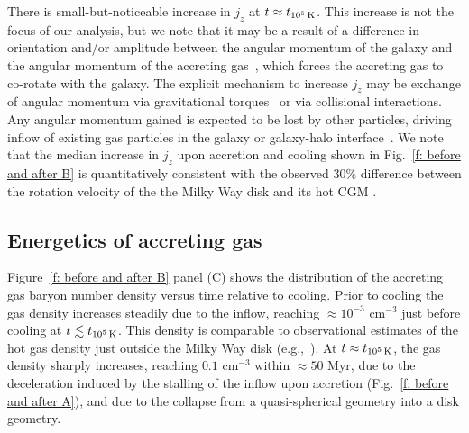 \documentclass[fleqn,usenatbib]{mnras}
\newcommand{\tcon}{t_{10^5\,{\rm K}}}
\begin{document}
There is small-but-noticeable increase in $j_z$ at $t \approx \tcon$.
This increase is not the focus of our analysis, but we note that it may be a result of a difference in orientation and/or amplitude between the angular momentum of the galaxy and the angular momentum of the accreting gas~\citep[e.g.][]{Danovich2012, DeFelippis2017}, which forces the accreting gas to co-rotate with the galaxy.
The explicit mechanism to increase $j_z$ may be exchange of angular momentum via gravitational torques~\citep[e.g.][]{Danovich2015} or via collisional interactions.
Any angular momentum gained is expected to be lost by other particles, driving inflow of existing gas particles in the galaxy or galaxy-halo interface~\citep[e.g.][]{Mayor1981, Pezzulli2017}.
We note that the median increase in $j_z$ upon accretion and cooling shown in Fig.~\ref{f: before and after B} is quantitatively consistent with the observed $30\%$ difference between the rotation velocity of the the Milky Way disk and its hot CGM \citep{Hodges-Kluck2016}.

\subsection{Energetics of accreting gas}
\label{s: mechanics -- energy balance}

Figure~\ref{f: before and after B} panel (C) shows the distribution of the accreting gas baryon number density  versus time relative to cooling.
Prior to cooling the gas density increases steadily due to the inflow, reaching $\approx10^{-3}$ cm$^{-3}$ just before cooling at $t\lesssim\tcon$.
This density is comparable to observational estimates of the hot gas density just outside the Milky Way disk (e.g.,~\cite{Li2017a}).
At $t\approx\tcon$, the gas density sharply increases, reaching $0.1$ cm$^{-3}$ within $\approx50$ Myr, due to the deceleration induced by the stalling of the inflow upon accretion (Fig.~\ref{f: before and after A}), and due to the collapse from a quasi-spherical geometry into a disk geometry. 
\end{document}
